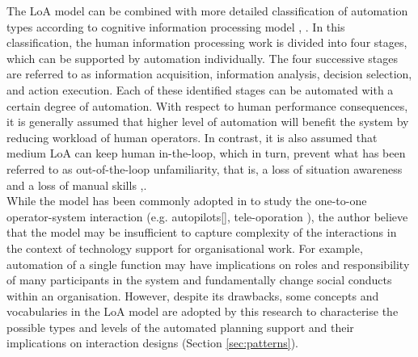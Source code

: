 The \ac{LoA} model can be combined with more detailed classification of automation types according to cognitive information processing model \cite{Parasuraman2000}, \cite{Manzey2012}. In this classification,  the human information processing work is divided into four stages, which can be supported by automation individually. The four successive stages are referred to as information acquisition, information analysis, decision selection, and action execution. Each of these identified stages can be automated with a certain degree of automation. With respect to human performance consequences, it is generally assumed that higher level of automation will benefit the system by reducing workload of human operators. In contrast, it is also assumed that medium \ac{LoA} can keep human in-the-loop, which in turn, prevent what has been referred to as out-of-the-loop unfamiliarity, that is, a loss of situation awareness and a loss of manual skills \cite{Kaber1997},\cite{Parasuraman2010}.\\

While the model has been commonly adopted in to study the one-to-one operator-system interaction (e.g. autopilots[], tele-oporation \cite{Schwarz2014}), the author believe that the model may be insufficient to capture complexity of the interactions in the context of technology support for organisational work. For example, automation of a single function may have implications on roles and responsibility of many participants in the system and fundamentally change social conducts within an organisation. However, despite its drawbacks, some concepts and vocabularies in the \ac{LoA} model are adopted by this research to characterise the possible types and levels of the automated planning support and their implications on interaction designs (Section \ref{sec:patterns}).\\

